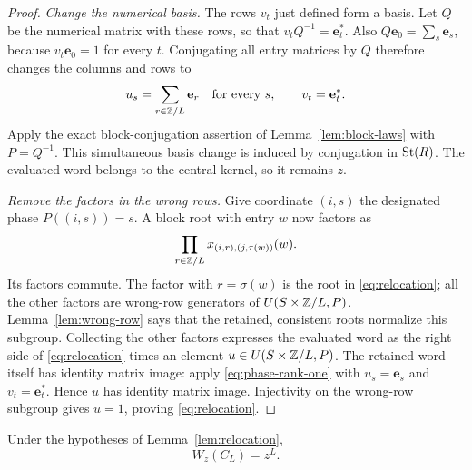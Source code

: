 \begin{proof}
\emph{Change the numerical basis.}
The rows $v_t$ just defined form a basis. Let $Q$ be the numerical
matrix with these rows, so that $v_tQ^{-1}=\mathbf e_t^*$.
Also $Q\mathbf e_0=\sum_s\mathbf e_s$, because
$v_t\mathbf e_0=1$ for every $t$. Conjugating all entry matrices
by $Q$ therefore changes the columns and rows to
\[
 u_s=\sum_{r\in\mathbb Z/L}\mathbf e_r\quad\text{for every }s,
 \qquad v_t=\mathbf e_t^*.
\]
Apply the exact block-conjugation assertion of
Lemma~\ref{lem:block-laws} with $P=Q^{-1}$. This simultaneous
basis change is induced by conjugation in $\operatorname{St}(R)$.
The evaluated word belongs to
the central kernel, so it remains $z$.

\emph{Remove the factors in the wrong rows.}
Give coordinate $(i,s)$ the designated phase $P((i,s))=s$.
A block root with entry $w$ now factors as
\[
 \prod_{r\in\mathbb Z/L}x_{(i,r),(j,\tau(w))}(w).
\]
Its factors commute. The factor with $r=\sigma(w)$ is the root
in \eqref{eq:relocation}; all the other factors are wrong-row
generators of $U(S\times\mathbb Z/L,P)$.
Lemma~\ref{lem:wrong-row} says that the retained, consistent roots
normalize this subgroup. Collecting the other factors expresses
the evaluated word as the right side of \eqref{eq:relocation}
times an element $u\in U(S\times\mathbb Z/L,P)$.
The retained word itself has identity matrix image: apply
\eqref{eq:phase-rank-one} with
$u_s=\mathbf e_s$ and $v_t=\mathbf e_t^*$.
Hence $u$ has identity matrix image. Injectivity on the wrong-row
subgroup gives $u=1$, proving \eqref{eq:relocation}.
\end{proof}

\begin{proposition}\label{prop:odd-power}
Under the hypotheses of Lemma~\ref{lem:relocation},
\begin{equation}\label{eq:odd-power}
 W_z(C_L)=z^L.
\end{equation}
\end{proposition}

